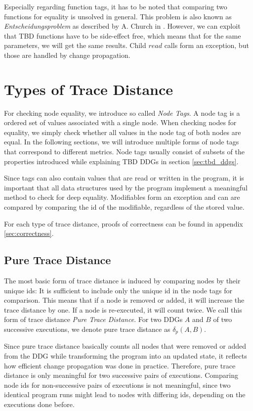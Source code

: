 Especially regarding function tags, it has to be noted that comparing two functions for equality is unsolved in general. This problem is also known as \textit{Entscheidungsproblem} as described by A. Church in \cite{church1936note}. However, we can exploit that TBD functions have to be side-effect free, which means that for the same parameters, we will get the same results. Child $read$ calls form an exception, but those are handled by change propagation. 
  
\section{Types of Trace Distance}
For checking node equality, we introduce so called \textit{Node Tags}. A node tag is a ordered set of values associated with a single node. When checking nodes for equality, we simply check whether all values in the node tag of both nodes are equal. In the following sections, we will introduce multiple forms of node tags that correspond to different metrics. Node tags usually consist of subsets of the properties introduced while explaining TBD DDGs in section \ref{sec:tbd_ddgs}.

Since tags can also contain values that are read or written in the program, it is important that all data structures used by the program implement a meaningful method to check for deep equality. Modifiables form an exception and can are compared by comparing the id of the modifiable, regardless of the stored value. 

For each type of trace distance, proofs of correctness can be found in appendix \ref{sec:correctness}.

\subsection{Pure Trace Distance}

The most basic form of trace distance is induced by comparing nodes by their unique ids: It is sufficient to include only the unique id in the node tags for comparison. This means that if a node is removed or added, it will increase the trace distance by one. If a node is re-executed, it will count twice. We call this form of trace distance \textit{Pure Trace Distance}. For two DDGs $A$ and $B$ of two successive executions, we denote pure trace distance as $\delta_p(A, B)$.

Since pure trace distance basically counts all nodes that were removed or added from the DDG while transforming the program into an updated state, it reflects how efficient change propagation was done in practice. Therefore, pure trace distance is only meaningful for two successive pairs of executions. Comparing node ids for non-successive pairs of executions is not meaningful, since two identical program runs might lead to nodes with differing ids, depending on the executions done before. 

